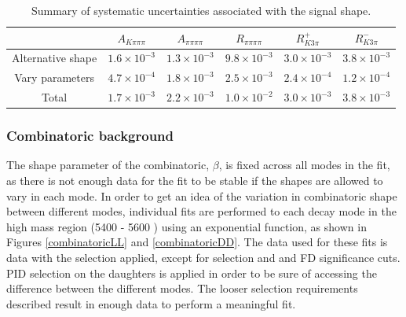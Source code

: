 \begin{table}[h]
\centering
{\footnotesize
{}
\begin{tabular}{cccccc}
\hline
& $A_{K\pi\pi\pi}$ & $A_{\pi\pi\pi\pi}$ & $R_{\pi\pi\pi\pi}$ & $R^+_{K3\pi}$ & $R^-_{K3\pi}$ \\
\hline
Alternative shape & $1.6 \times 10^{-3}$ & $1.3 \times 10^{-3}$ & $9.8 \times 10^{-3}$ & $3.0 \times 10^{-3}$ & $3.8 \times 10^{-3}$ \\
Vary parameters & $4.7 \times 10^{-4}$ & $1.8 \times 10^{-3}$ & $2.5 \times 10^{-3}$ & $2.4 \times 10^{-4}$ & $1.2 \times 10^{-4}$ \\
\hline
Total & $1.7 \times 10^{-3}$ & $2.2 \times 10^{-3}$ & $1.0 \times 10^{-2}$ & $3.0 \times 10^{-3}$ & $3.8 \times 10^{-3}$ \\
\hline
\end{tabular}}
\caption{Summary of systematic uncertainties associated with the signal shape.}
\label{signalshapeSystematics}
\end{table}

\subsubsection{Combinatoric background}

The shape parameter of the combinatoric, $\beta$, is fixed across all \Dz modes in the \CP fit, as there is not enough data for the fit to be stable if the shapes are allowed to vary in each mode. In order to get an idea of the variation in combinatoric shape between different \Dz modes, individual fits are performed to each \Dz decay mode in the high \Bm mass region (5400 - 5600 \mevcc) using an exponential function, as shown in Figures \ref{combinatoricLL} and \ref{combinatoricDD}. The data used for these fits is \runone data with the selection applied, except for \Kstar selection and \Dz and \KS FD significance cuts. PID selection on the \Dz daughters is applied in order to be sure of accessing the difference between the different \Dz modes. The looser selection requirements described result in enough data to perform a meaningful fit.

